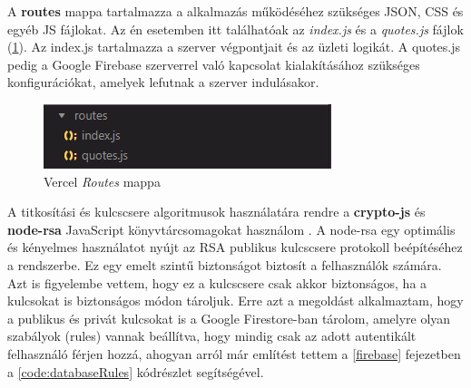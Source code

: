 A \textbf{routes} mappa tartalmazza a alkalmazás működéséhez szükséges JSON, CSS és egyéb JS fájlokat. Az én esetemben itt találhatóak az \textit{index.js} és a \textit{quotes.js} fájlok (\ref{abra:vercelRoutes}). Az index.js tartalmazza a szerver végpontjait és az üzleti logikát. A quotes.js pedig a Google Firebase szerverrel való kapcsolat kialakításához szükséges konfigurációkat, amelyek lefutnak a szerver indulásakor.

\begin{figure}[!h]
	\centering
	\includegraphics[scale=0.8]{images/vercelRoutes}
	\caption{Vercel \textit{Routes} mappa}
	\label{abra:vercelRoutes}
\end{figure}

A titkosítási és kulcscsere algoritmusok használatára rendre a \textbf{crypto-js} és \textbf{node-rsa} JavaScript könyvtárcsomagokat használom \cite{NRSA} \cite{CJS}. A node-rsa egy optimális és kényelmes használatot nyújt az RSA publikus kulcscsere protokoll beépítéséhez a rendszerbe. Ez egy emelt szintű biztonságot biztosít a felhasználók számára. Azt is figyelembe vettem, hogy ez a kulcscsere csak akkor biztonságos, ha a kulcsokat is biztonságos módon tároljuk. Erre azt a megoldást alkalmaztam, hogy a publikus és privát kulcsokat is a Google Firestore-ban tárolom, amelyre olyan szabályok (rules) vannak beállítva, hogy mindig csak az adott autentikált felhasználó férjen hozzá, ahogyan arról már említést tettem a \ref{firebase} fejezetben a \ref{code:databaseRules} kódrészlet segítségével.